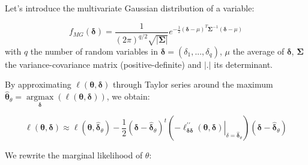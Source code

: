 Let's introduce the multivariate Gaussian distribution of a variable: 

$$f_{MG}(\boldsymbol{\delta})=\frac{1}{(2 \pi)^{q / 2} \sqrt{|\boldsymbol{\Sigma}|}} e^{-\frac{1}{2}(\mathbf{\delta}-\mu)^{T} \boldsymbol{\Sigma}^{-1}(\mathbf{\delta}-\mu)}$$ with $q$ the number of random variables in $\mathbf{\delta} = (\delta_1,...,\delta_q)$, $\mu$ the average of $\mathbf{\delta}$, $\boldsymbol{\Sigma}$ the variance-covariance matrix (positive-definite) and $|.|$ its determinant. 

By approximating $\ell(\boldsymbol{\theta},\boldsymbol{\delta})$ through Taylor series around the maximum $\hat{\boldsymbol{\theta}}_{\theta}=\underset{\boldsymbol{\delta}}{\operatorname{argmax}} (\ell(\boldsymbol{\theta},\mathbf{\delta}))$, we obtain:

$$\ell(\boldsymbol{\theta},\boldsymbol{\delta}) \approx \ell\left(\boldsymbol{\theta},\hat{\boldsymbol{\delta}}_{\theta} \right)-\frac{1}{2}\left(\boldsymbol{\delta}-\hat{\boldsymbol{\delta}}_{\theta}\right)^{t}\left(-\left.\ell_{\boldsymbol{\delta} \boldsymbol{\delta}}^{\prime \prime}(\boldsymbol{\theta},\boldsymbol{\delta})\right|_{\delta=\hat{\boldsymbol{\delta}}_{\theta}}\right)\left(\mathbf{\boldsymbol{\delta}}-\hat{\boldsymbol{\delta}}_{\theta}\right)$$

We rewrite the marginal likelihood of $\theta$:

